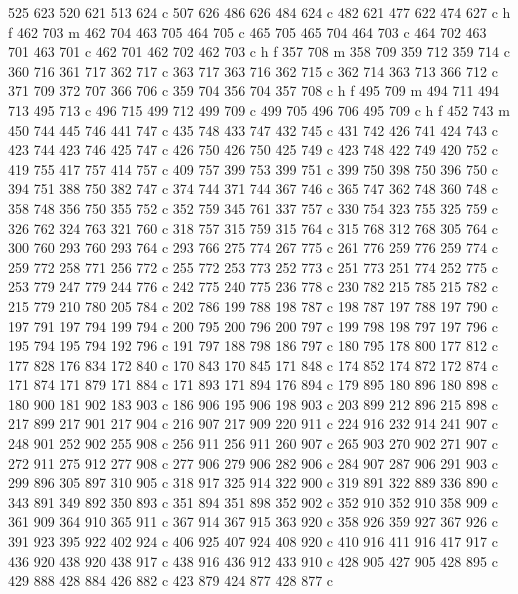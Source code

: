 {{   525 623 520 621 513 624 c
   507 626 486 626 484 624 c
   482 621 477 622 474 627 c
   h f
   462 703 m
   462 704 463 705 464 705 c
   465 705 465 704 464 703 c
   464 702 463 701 463 701 c
   462 701 462 702 462 703 c
   h f
   357 708 m
   358 709 359 712 359 714 c
   360 716 361 717 362 717 c
   363 717 363 716 362 715 c
   362 714 363 713 366 712 c
   371 709 372 707 366 706 c
   359 704 356 704 357 708 c
   h f
   495 709 m
   494 711 494 713 495 713 c
   496 715 499 712 499 709 c
   499 705 496 706 495 709 c
   h f
   452 743 m
   450 744 445 746 441 747 c
   435 748 433 747 432 745 c
   431 742 426 741 424 743 c
   423 744 423 746 425 747 c
   426 750 426 750 425 749 c
   423 748 422 749 420 752 c
   419 755 417 757 414 757 c
   409 757 399 753 399 751 c
   399 750 398 750 396 750 c
   394 751 388 750 382 747 c
   374 744 371 744 367 746 c
   365 747 362 748 360 748 c
   358 748 356 750 355 752 c
   352 759 345 761 337 757 c
   330 754 323 755 325 759 c
   326 762 324 763 321 760 c
   318 757 315 759 315 764 c
   315 768 312 768 305 764 c
   300 760 293 760 293 764 c
   293 766 275 774 267 775 c
   261 776 259 776 259 774 c
   259 772 258 771 256 772 c
   255 772 253 773 252 773 c
   251 773 251 774 252 775 c
   253 779 247 779 244 776 c
   242 775 240 775 236 778 c
   230 782 215 785 215 782 c
   215 779 210 780 205 784 c
   202 786 199 788 198 787 c
   198 787 197 788 197 790 c
   197 791 197 794 199 794 c
   200 795 200 796 200 797 c
   199 798 198 797 197 796 c
   195 794 195 794 192 796 c
   191 797 188 798 186 797 c
   180 795 178 800 177 812 c
   177 828 176 834 172 840 c
   170 843 170 845 171 848 c
   174 852 174 872 172 874 c
   171 874 171 879 171 884 c
   171 893 171 894 176 894 c
   179 895 180 896 180 898 c
   180 900 181 902 183 903 c
   186 906 195 906 198 903 c
   203 899 212 896 215 898 c
   217 899 217 901 217 904 c
   216 907 217 909 220 911 c
   224 916 232 914 241 907 c
   248 901 252 902 255 908 c
   256 911 256 911 260 907 c
   265 903 270 902 271 907 c
   272 911 275 912 277 908 c
   277 906 279 906 282 906 c
   284 907 287 906 291 903 c
   299 896 305 897 310 905 c
   318 917 325 914 322 900 c
   319 891 322 889 336 890 c
   343 891 349 892 350 893 c
   351 894 351 898 352 902 c
   352 910 352 910 358 909 c
   361 909 364 910 365 911 c
   367 914 367 915 363 920 c
   358 926 359 927 367 926 c
   391 923 395 922 402 924 c
   406 925 407 924 408 920 c
   410 916 411 916 417 917 c
   436 920 438 920 438 917 c
   438 916 436 912 433 910 c
   428 905 427 905 428 895 c
   429 888 428 884 426 882 c
   423 879 424 877 428 877 c
}}
